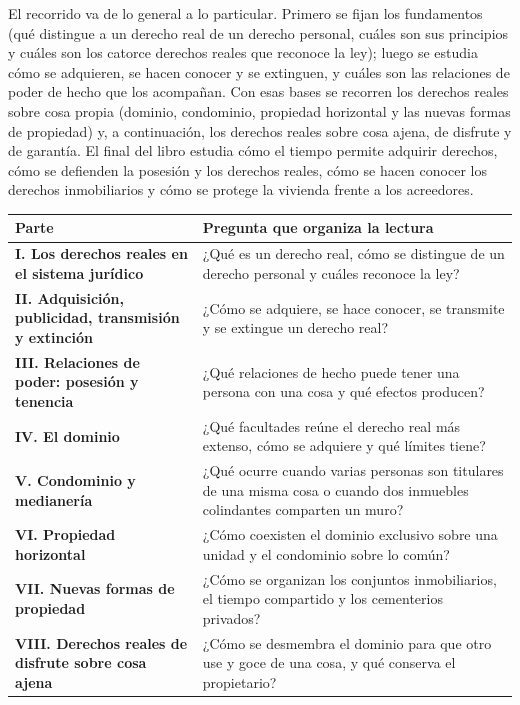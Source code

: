 \documentclass[12pt,oneside]{book}
\begin{document}
El recorrido va de lo general a lo particular. Primero se fijan los fundamentos (qué distingue a un derecho real de un derecho personal, cuáles son sus principios y cuáles son los catorce derechos reales que reconoce la ley); luego se estudia cómo se adquieren, se hacen conocer y se extinguen, y cuáles son las relaciones de poder de hecho que los acompañan. Con esas bases se recorren los derechos reales sobre cosa propia (dominio, condominio, propiedad horizontal y las nuevas formas de propiedad) y, a continuación, los derechos reales sobre cosa ajena, de disfrute y de garantía. El final del libro estudia cómo el tiempo permite adquirir derechos, cómo se defienden la posesión y los derechos reales, cómo se hacen conocer los derechos inmobiliarios y cómo se protege la vivienda frente a los acreedores.

\begin{center}
\begin{tabularx}{\textwidth}{@{}>{\raggedright\arraybackslash}p{}>{\raggedright\arraybackslash}X@{}}
\toprule
\textbf{Parte} & \textbf{Pregunta que organiza la lectura} \\
\midrule
\textbf{I. Los derechos reales en el sistema jurídico} & ¿Qué es un derecho real, cómo se distingue de un derecho personal y cuáles reconoce la ley? \\
\textbf{II. Adquisición, publicidad, transmisión y extinción} & ¿Cómo se adquiere, se hace conocer, se transmite y se extingue un derecho real? \\
\textbf{III. Relaciones de poder: posesión y tenencia} & ¿Qué relaciones de hecho puede tener una persona con una cosa y qué efectos producen? \\
\textbf{IV. El dominio} & ¿Qué facultades reúne el derecho real más extenso, cómo se adquiere y qué límites tiene? \\
\textbf{V. Condominio y medianería} & ¿Qué ocurre cuando varias personas son titulares de una misma cosa o cuando dos inmuebles colindantes comparten un muro? \\
\textbf{VI. Propiedad horizontal} & ¿Cómo coexisten el dominio exclusivo sobre una unidad y el condominio sobre lo común? \\
\textbf{VII. Nuevas formas de propiedad} & ¿Cómo se organizan los conjuntos inmobiliarios, el tiempo compartido y los cementerios privados? \\
\textbf{VIII. Derechos reales de disfrute sobre cosa ajena} & ¿Cómo se desmembra el dominio para que otro use y goce de una cosa, y qué conserva el propietario? \\

\end{tabularx}
\end{center}
\end{document}
